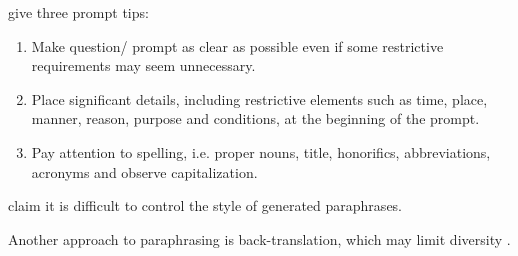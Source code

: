 \citet{fu_learning_2024} give three prompt tips:
\begin{enumerate}
    \item Make question/ prompt as clear as possible even if some restrictive requirements may seem unnecessary.
    \item Place significant details, including restrictive elements such as time, place, manner, reason, purpose and conditions, at the beginning of the prompt.
    \item Pay attention to spelling, i.e. proper nouns, title, honorifics, abbreviations, acronyms and observe capitalization.
\end{enumerate}

\citet{zhou_paraphrase_2021} claim it is difficult to control the style of generated paraphrases.

Another approach to paraphrasing is back-translation, which may limit diversity \cite{zhou_paraphrase_2025}.

